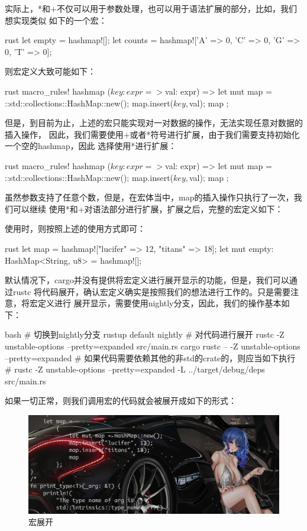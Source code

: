 实际上，*和+不仅可以用于参数处理，也可以用于语法扩展的部分，比如，我们想实现类似
如下的一个宏：
\begin{code-block}{rust}
let empty = hashmap![];
let counts = hashmap!['A' => 0, 'C' => 0, 'G' => 0, 'T' => 0];
\end{code-block}
则宏定义大致可能如下：
\begin{code-block}{rust}
macro_rules! hashmap {
    ($key: expr => $val: expr) => {{
        let mut map = ::std::collections::HashMap::new();
        map.insert($key, $val);
        map
    }};
}
\end{code-block}
但是，到目前为止，上述的宏只能实现对一对数据的操作，无法实现任意对数据的插入操作，
因此，我们需要使用+或者*符号进行扩展，由于我们需要支持初始化一个空的hashmap，因此
选择使用*进行扩展：
\begin{code-block}{rust}
macro_rules! hashmap {
    ($key: expr => $val: expr) => {{
        let mut map = ::std::collections::HashMap::new();
        map.insert($key, $val);
        map
    }};
}
\end{code-block}
虽然参数支持了任意个数，但是，在宏体当中，map的插入操作只执行了一次，我们可以继续
使用*和+对语法部分进行扩展，扩展之后，完整的宏定义如下：
使用时，则按照上述的使用方式即可：
\begin{code-block}{rust}
let map = hashmap!["lucifer" => 12, "titans" => 18];
let mut empty: HashMap<String, u8> = hashmap![];
\end{code-block}
默认情况下，cargo并没有提供将宏定义进行展开显示的功能，但是，我们可以通过rustc
将代码展开，确认宏定义确实是按照我们的想法进行工作的。只是需要注意，将宏定义进行
展开显示，需要使用nightly分支，因此，我们的操作基本如下：
\begin{code-block}{bash}
# 切换到nightly分支
rustup default nightly
# 对代码进行展开
rustc -Z unstable-options --pretty=expanded src/main.rs
cargo rustc -- -Z unstable-options --pretty=expanded
# 如果代码需要依赖其他的非std的crate的，则应当如下执行
# rustc -Z unstable-options --pretty=expanded -L ../target/debug/deps src/main.rs
\end{code-block}
如果一切正常，则我们调用宏的代码就会被展开成如下的形式：
\begin{figure}[H]
  \centering
  \includegraphics[width=\linewidth]{rust_macro_expand.png}
  \caption{宏展开}
  \label{fig:rust_macro_expand}
\end{figure}

